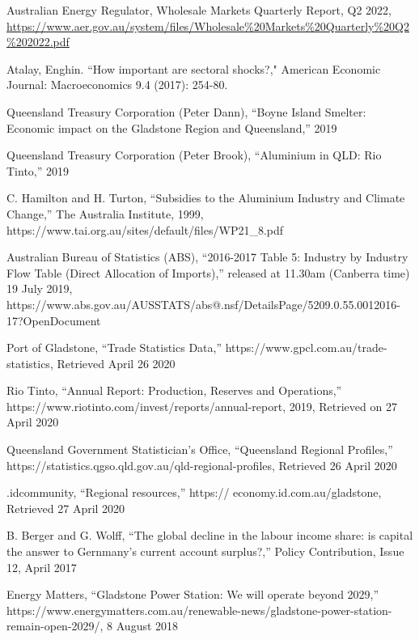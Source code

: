 \documentclass[12pt,a4paper]{article}
\begin{document}
\begin{thebibliography}{1}

   Australian Energy Regulator, Wholesale Markets Quarterly
    Report, Q2 2022, \url{https://www.aer.gov.au/system/files/Wholesale%20Markets%20Quarterly%20Q2%202022.pdf}

   Atalay, Enghin. ``How important are sectoral shocks?,"
    American Economic Journal: Macroeconomics 9.4 (2017): 254-80.

 Queensland Treasury Corporation (Peter Dann), “Boyne Island
  Smelter: Economic impact on the Gladstone Region and Queensland,” 2019

Queensland Treasury Corporation (Peter Brook), ``Aluminium in QLD: Rio Tinto,” 2019
  
C. Hamilton and H. Turton, ``Subsidies to the Aluminium
Industry and Climate Change,'' The Australia Institute, 1999, https://www.tai.org.au/sites/default/files/WP21\_8.pdf

 Australian Bureau of Statistics (ABS), ``2016-2017 Table 5: Industry by
  Industry Flow Table (Direct Allocation of Imports),” released at 11.30am
  (Canberra time) 19 July 2019, https://www.abs.gov.au/AUSSTATS/abs@.nsf/DetailsPage/5209.0.55.0012016-17?OpenDocument

 Port of Gladstone, ``Trade Statistics Data,''
 https://www.gpcl.com.au/trade-statistics, Retrieved  April 26 2020

  Rio Tinto, ``Annual Report: Production, Reserves and Operations,''
https://www.riotinto.com/invest/reports/annual-report, 2019, Retrieved on
27 April 2020

  Queensland Government Statistician’s Office,
  ``Queensland Regional Profiles,”
https://statistics.qgso.qld.gov.au/qld-regional-profiles, Retrieved 26 April 2020 
 
  .idcommunity, “Regional resources,” 
  https:// economy.id.com.au/gladstone, Retrieved 27 April 2020

B. Berger and G. Wolff, “The global decline in the labour income share: is
capital the answer to Gernmany’s current account surplus?,” Policy Contribution,
Issue 12, April 2017

 Energy Matters, “Gladstone Power Station: We will operate
  beyond 2029,”
  https://www.energymatters.com.au/renewable-news/gladstone-power-station-remain-open-2029/,
  8 August 2018


\end{thebibliography}
\end{document}
